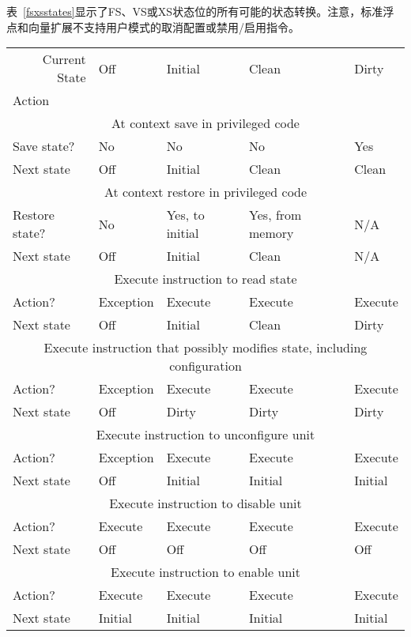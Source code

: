 表~\ref{fsxsstates}显示了FS、VS或XS状态位的所有可能的状态转换。注意，标准浮点和向量扩展不支持用户模式的取消配置或禁用/启用指令。

\begin{table*}[h!]
\begin{center}
\begin{tabular}{|l|l|l|l|l|}
\hline
\multicolumn{1}{|r|}{Current State} & Off & Initial & Clean & Dirty \\
Action & & & &\\
\hline
\hline
\multicolumn{5}{|c|}{At context save in privileged code}\\
\hline
Save state?    & No         & No        & No     & Yes \\
Next state       & Off        & Initial   & Clean  & Clean \\
\hline
\hline
\multicolumn{5}{|c|}{At context restore in privileged code}\\
\hline
Restore state? & No        & Yes, to initial & Yes, from memory   & N/A \\
Next state     & Off       & Initial   & Clean  & N/A \\
\hline
\hline
\multicolumn{5}{|c|}{Execute instruction to read state}\\
\hline
Action?        & Exception & Execute   & Execute & Execute \\
Next state     & Off       & Initial   & Clean  & Dirty \\
\hline
\hline
\multicolumn{5}{|c|}{Execute instruction that possibly modifies state, including configuration}\\
\hline
Action?        & Exception & Execute & Execute & Execute \\
Next state     & Off       & Dirty   & Dirty  & Dirty \\
\hline
\hline
\multicolumn{5}{|c|}{Execute instruction to unconfigure unit}\\
\hline
Action?        & Exception & Execute & Execute & Execute \\
Next state     & Off       & Initial & Initial & Initial \\
\hline
\hline
\multicolumn{5}{|c|}{Execute instruction to disable unit}\\
\hline
Action?        & Execute   & Execute & Execute & Execute \\
Next state     & Off       & Off     & Off     & Off \\
\hline
\hline
\multicolumn{5}{|c|}{Execute instruction to enable unit}\\
\hline
Action?        & Execute   & Execute & Execute & Execute \\
Next state     & Initial   & Initial & Initial & Initial   \\
\hline
\end{tabular}
\end{center}
\caption{FS, VS, and XS state transitions.}
\label{fsxsstates}
\end{table*}

